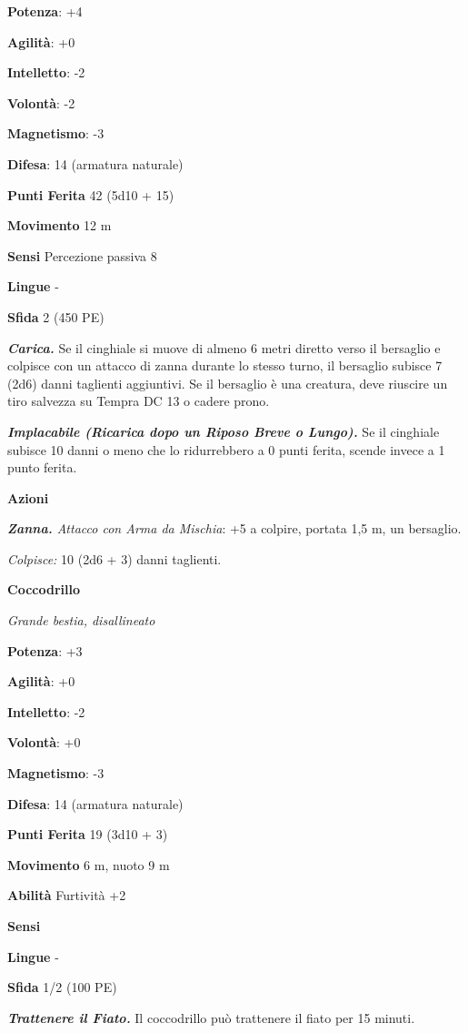 \begin{multicols}{2}
\textbf{Potenza}: +4

\textbf{Agilità}: +0

\textbf{Intelletto}: -2

\textbf{Volontà}: -2

\textbf{Magnetismo}: -3

\textbf{Difesa}: 14 (armatura naturale)

\textbf{Punti Ferita} 42 (5d10 + 15)

\textbf{Movimento} 12 m

\textbf{Sensi} Percezione passiva 8

\textbf{Lingue} -

\textbf{Sfida} 2 (450 PE)

\emph{\textbf{Carica.}} Se il cinghiale si muove di almeno 6 metri
diretto verso il bersaglio e colpisce con un attacco di zanna durante lo
stesso turno, il bersaglio subisce 7 (2d6) danni taglienti aggiuntivi.
Se il bersaglio è una creatura, deve riuscire un tiro salvezza su Tempra
DC 13 o cadere prono.

\emph{\textbf{Implacabile (Ricarica dopo un Riposo Breve o Lungo).}} Se
il cinghiale subisce 10 danni o meno che lo ridurrebbero a 0 punti
ferita, scende invece a 1 punto ferita.

\textbf{Azioni}

\emph{\textbf{Zanna.} Attacco con Arma da Mischia}: +5 a colpire,
portata 1,5 m, un bersaglio.

\emph{Colpisce:} 10 (2d6 + 3) danni taglienti.



\textbf{Coccodrillo}

\emph{Grande bestia, disallineato}

\textbf{Potenza}: +3

\textbf{Agilità}: +0

\textbf{Intelletto}: -2

\textbf{Volontà}: +0

\textbf{Magnetismo}: -3

\textbf{Difesa}: 14 (armatura naturale)

\textbf{Punti Ferita} 19 (3d10 + 3)

\textbf{Movimento} 6 m, nuoto 9 m

\textbf{Abilità} Furtività +2

\textbf{Sensi} 

\textbf{Lingue} -

\textbf{Sfida} 1/2 (100 PE)

\emph{\textbf{Trattenere il Fiato.}} Il coccodrillo può trattenere il
fiato per 15 minuti.


\end{multicols}

